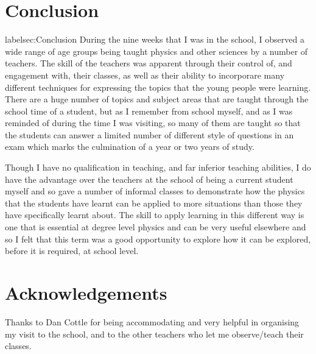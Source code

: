 \section{Conclusion} %
label{sec:Conclusion}
    During the nine weeks that I was in the school, I observed a wide range of age groups being taught physics and other sciences by a number of teachers. The skill of the teachers was apparent through their control of, and engagement with, their classes, as well as their ability to incorporare many different techniques for expressing the topics that the young people were learning. There are a huge number of topics and subject areas that are taught through the school time of a student, but as I remember from school myself, and as I was reminded of during the time I was visiting, so many of them are taught so that the students can answer a limited number of different style of questions in an exam which marks the culmination of a year or two years of study.

    Though I have no qualification in teaching, and far inferior teaching abilities, I do have the advantage over the teachers at the school of being a current student myself and so gave a number of informal classes to demonstrate how the physics that the students have learnt can be applied to more situations than those they have specifically learnt about. The skill to apply learning in this different way is one that is essential at degree level physics and can be very useful elsewhere and so I felt that this term was a good opportunity to explore how it can be explored, before it is required, at school level. 

\section{Acknowledgements} %
\label{sec:Acknowlegements}
    Thanks to Dan Cottle for being accommodating and very helpful in organising my visit to the school, and to the other teachers who let me observe/teach their classes.
